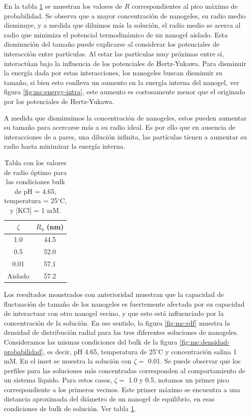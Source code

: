 	En la tabla \ref{tabla:mc:R-optimos} se muestran los valores de $R$ correspondientes al pico m\'aximo de probabilidad. Se observa que a mayor concentraci\'on de nanogeles, su radio medio disminuye, y a medida que diluimos m\'as la soluci\'on, el radio medio se acerca al radio que minimiza el potencial termodin\'amico de un nanogel aislado.
	Esta disminuci\'on del tama\~no puede explicarse al considerar los potenciales de interacci\'on entre part\'iculas. Al estar las part\'iculas muy pr\'oximas entre s\'i, interact\'uan bajo la influencia de los potenciales de Hertz-Yukawa. Para disminuir la energ\'ia dada por estas interacciones, los nanogeles buscan disminuir su tama\~no, si bien esto conlleva un aumento en la energ\'ia interna del nanogel, ver figura \ref{fig:mc:energy-intra}, este aumento es costosamente menor que el originado por los potenciales de Hertz-Yukawa.
	
	A medida que disminuimos la concentraci\'on de nanogeles, estos pueden aumentar su tama\~no para acercarse m\'as a su radio ideal. Es por ello que en ausencia de interacciones de a pares, una diluci\'on infinita, las part\'iculas tienen a aumentar su radio hasta minimizar la energ\'ia interna.
	
	
	\begin{table}[!htb]
		\centering
		\begin{tabular}{|c|c|} \hline  
			$\zeta$& $R_0$ (nm)\\ \hline  
			1.0& 44.5\\ \hline  
			0.5& 52.0\\ \hline  
			0.01& 57.1\\ \hline
			Aislado & 57.2 \\ \hline
		\end{tabular}
		\caption{Tabla con los valores de radio \'optimo para las condiciones bulk de pH = 4.65, temperatura = 25$^\circ$C, y [KCl] = 1 mM.}
		\label{tabla:mc:R-optimos}
	\end{table}
	
	Los resultados monstrados con anterioridad muestran que la capacidad de fluctuaci\'on de tama\~no de los nanogeles es fuertemente afectada por su capacidad de interactuar con otro nanogel vecino, y que esto est\'a influenciado por la concentraci\'on de la soluci\'on.
	En ese sentido, la figura \ref{fig:mc:rdf} muestra la densidad de distribuci\'on radial para las tres diferentes soluciones de nanogeles. Consideramos las mismas condiciones del bulk de la figura \ref{fig:mc:densidad-probabilidad}, es decir, pH 4.65, temperatura de 25$^\circ$C y concentraci\'on salina 1 mM.
	En el inset se muestra la solución con $\zeta =$ 0.01.
	Se puede observar que los perfiles para las soluciones m\'as concentradas corresponden al comportamiento de un sistema l\'iquido. Para estos casos, $\zeta = $ 1.0 y 0.5, notamos un primer pico correspondiente a los primeros vecinos. Este primer m\'aximo se encuentra a una distancia aproximada del di\'ametro de un nanogel de equilibrio, en esas condiciones de bulk de soluci\'on. Ver tabla \ref{tabla:mc:R-optimos}.
	
